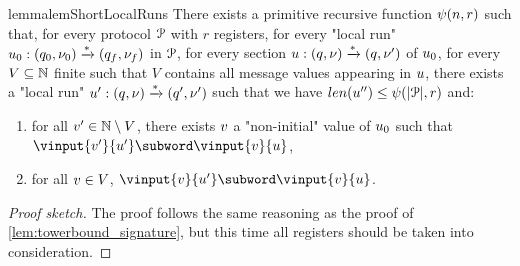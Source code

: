 \begin{restatable}{lemma}{lemShortLocalRuns}
	\label{lem:short-local-runs}
	There exists a primitive recursive function $\psi(n,r)$ such that, for every protocol $\mathcal{P}$ with $r$ registers, for every "local run" $u_0: (q_0, \nu_0) \xrightarrow{*} (q_f, \nu_f)$ in $\mathcal{P}$, for every section $u : (q, \nu) \xrightarrow{*} (q, \nu')$ of $u_0$,  for every $V \subseteq \mathbb{N}$ finite such that $V$ contains all message values appearing in $u$, there exists a "local run" $u': (q, \nu) \xrightarrow{*} (q', \nu')$ such that we have $\length{\localrun''} \leq \towerfun(\size{\prot},r)$ and:
	\begin{enumerate}
		\item for all $v' \in \mathbb{N} \setminus V$, there exists $v$ a "non-initial" value of $u_0$ such that $\vinput{\aval'}{\localrun'}\subword \vinput{\aval}{\localrun}$,
		\item for all $v \in V$, $\vinput{\aval}{\localrun'} \subword \vinput{\aval}{\localrun}$. 
	\end{enumerate}
\end{restatable}

\begin{proof}[Proof sketch]
	
	
	The proof follows the same reasoning as the proof of \cref{lem:towerbound_signature}, but this time all registers should be taken into consideration.
	
	
	
\end{proof}

